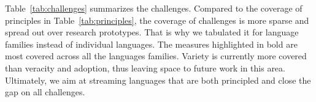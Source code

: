 Table~\ref{tab:challenges} summarizes the challenges.  Compared to the
coverage of principles in Table~\ref{tab:principles}, the coverage of
challenges is more sparse and spread out over research prototypes.
That is why we tabulated it for language families instead of
individual languages.  The measures highlighted in bold are most
covered across all the languages families. Variety is currently more
covered than veracity and adoption, thus leaving space to future work in
this area. 
Ultimately, we aim at streaming languages that are
both principled and close the gap on all challenges.
